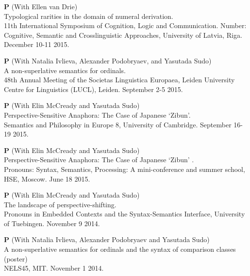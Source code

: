 \documentclass[12pt,letterpaper]{article}
\begin{document}
{\begin{hangparas}{.25in}{1}
\textbf{P} \hspace{1mm} (With Ellen van Drie) \\Typological rarities in the domain of numeral derivation. \\ 11th International Symposium of Cognition, Logic and Communication. Number: Cognitive, Semantic and Crosslinguistic Approaches, University of Latvia, Riga. December 10-11 2015.

\vspace{1mm}

\textbf{P} \hspace{2mm} (With Natalia Ivlieva, Alexander Podobryaev, and Yasutada Sudo) \\ A non-superlative semantics for ordinals.\\ 48th Annual Meeting of the Societas Linguistica Europaea, Leiden University Centre for Linguistics (LUCL), Leiden. September 2-5 2015.

\vspace{1mm}

\textbf{P} \hspace{1.2mm} (With Elin McCready and Yasutada Sudo) \\Perspective-Sensitive Anaphora: The Case of Japanese `Zibun'. \\Semantics and Philosophy in Europe 8, University of Cambridge. 
September 16-19 2015.

\vspace{1mm}

\textbf{P} \hspace{1.2mm} (With Elin McCready and Yasutada Sudo) \\ Perspective-Sensitive Anaphora: The Case of Japanese `Zibun' .\\Pronouns: Syntax, Semantics, Processing: A mini-conference and summer school, HSE, Moscow. June 18 2015.

\vspace{1mm}

\textbf{P} \hspace{1.2mm} (With Elin McCready and Yasutada Sudo) \\The landscape of perspective-shifting. \\Pronouns in Embedded Contexts and the Syntax-Semantics Interface, University of Tuebingen. November 9 2014.

\vspace{1mm}

\textbf{P} \hspace{1.2mm} (With Natalia Ivlieva, Alexander Podobryaev and Yasutada Sudo) \\ A non-superlative semantics for ordinals and the syntax of comparison classes (poster) \\ NELS45, MIT. November 1 2014.


\end{hangparas}}
\end{document}
